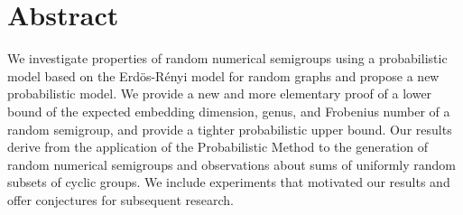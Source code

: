 \chapter*{Abstract}

We investigate properties of random numerical semigroups using a probabilistic model based on the Erdös-Rényi model for random graphs and propose a new probabilistic model. We provide a new and more elementary proof of a lower bound of the expected embedding dimension, genus, and Frobenius number of a random semigroup, and provide a tighter probabilistic upper bound. Our results derive from the application of the Probabilistic Method to the generation of random numerical semigroups and observations about sums of uniformly random subsets of cyclic groups. We include experiments that motivated our results and offer conjectures for subsequent research.
